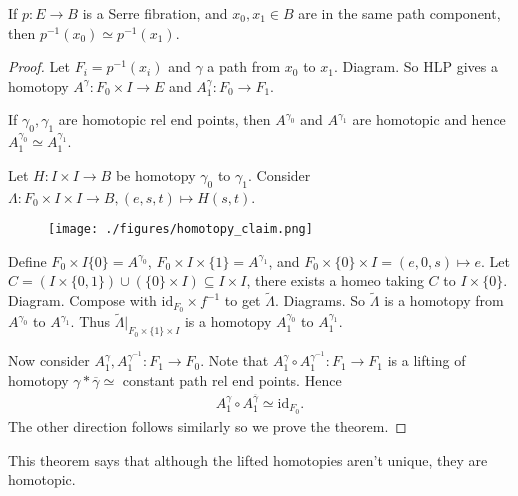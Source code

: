 \documentclass[12pt,class=article,crop=false]{standalone}
\begin{document}
\begin{thm}
If $ p: E \to B$ is a Serre fibration, and $ x_0,x_1 \in B$ are in the same path component, then $ p^{-1}(x_0) \simeq p ^{-1}(x_1)$.
\end{thm}
\begin{proof}
Let $ F_i= p ^{-1}(x_i)$ and $ \gamma$ a path from $ x_0 $ to $ x_1$. Diagram. So HLP gives a homotopy $ A^{ \gamma} : F_0 \times I \to E$ and $ A_1^{ \gamma} : F_0 \to F_1$.
\begin{claim}
	If $ \gamma_0 , \gamma_1$ are homotopic rel end points, then $ A^{ \gamma_0}$ and $ A^{ \gamma_1}$ are homotopic and hence $ A_1^{ \gamma_0} \simeq A_1^{ \gamma_1}$. 
\end{claim}

Let $ H: I \times I \to B$ be homotopy $ \gamma_0$ to $ \gamma_1$. Consider $ \Lambda: F_0 \times I \times I \to B, ( e,s,t)\mapsto H(s,t)$. 
~\begin{figure}[H]
	\centering
	\texttt{[image: ./figures/homotopy\_claim.png]}
\end{figure}

Define $ F_0 \times I \{0\} = A^{ \gamma_0} $, $ F_0 \times I \times \{1\} = A^{ \gamma_1} $, and $ F_0 \times \{0\} \times I = (e,0,s)\mapsto e $. Let $ C = (I \times \{0,1\} ) \cup (\{0\} \times I) \subseteq I \times I$, there exists a homeo taking $ C$ to  $ I \times \{0\} $.  
Diagram. Compose with $ \text{id}_{ F_0} \times f^{-1}$ to get $ \widetilde{ \Lambda}$. Diagrams. So $ \widetilde{ \Lambda}$ is a homotopy from $ A^{ \gamma_0}$ to $ A^{ \gamma_1}$. Thus $ \widetilde{ \Lambda}|_{F_0 \times \{1\} \times I}$ is a homotopy $ A_1^{ \gamma_0}$ to $ A_1 ^{ \gamma_1}$.

Now consider $A_1^{ \gamma}, A_1^{ \gamma^{-1}}: F_1 \to F_0$. Note that $ A_1^{ \gamma} \circ A_1^{ \gamma ^{-1}}: F_1 \to F_1$ is a lifting of homotopy $ \gamma * \overline{\gamma} \simeq$ constant path rel end points. Hence
	\begin{align*}
		A_1^{ \gamma} \circ A_1^{ \overline{ \gamma}} \simeq \text{id}_{ F_0}.
	\end{align*}
	The other direction follows similarly so we prove the theorem.
\end{proof}
\begin{remark}
This theorem says that although the lifted homotopies aren't unique, they are homotopic.
\end{remark}
\end{document}
